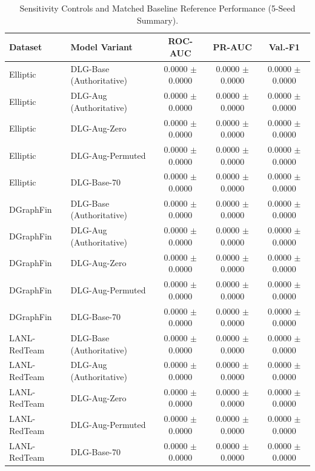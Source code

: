 \begin{table}[t]
\centering
\caption{Sensitivity Controls and Matched Baseline Reference Performance (5-Seed Summary).}
\label{tab:capacity_controls_summary}
\scriptsize
\begin{tabular}{l l c c c}
\toprule
\textbf{Dataset} & \textbf{Model Variant} & \textbf{ROC-AUC} & \textbf{PR-AUC} & \textbf{Val.-F1} \\
\midrule
Elliptic & DLG-Base (Authoritative) & 0.0000 $\pm$ 0.0000 & 0.0000 $\pm$ 0.0000 & 0.0000 $\pm$ 0.0000 \\
Elliptic & DLG-Aug (Authoritative) & 0.0000 $\pm$ 0.0000 & 0.0000 $\pm$ 0.0000 & 0.0000 $\pm$ 0.0000 \\
Elliptic & DLG-Aug-Zero & 0.0000 $\pm$ 0.0000 & 0.0000 $\pm$ 0.0000 & 0.0000 $\pm$ 0.0000 \\
Elliptic & DLG-Aug-Permuted & 0.0000 $\pm$ 0.0000 & 0.0000 $\pm$ 0.0000 & 0.0000 $\pm$ 0.0000 \\
Elliptic & DLG-Base-70 & 0.0000 $\pm$ 0.0000 & 0.0000 $\pm$ 0.0000 & 0.0000 $\pm$ 0.0000 \\
DGraphFin & DLG-Base (Authoritative) & 0.0000 $\pm$ 0.0000 & 0.0000 $\pm$ 0.0000 & 0.0000 $\pm$ 0.0000 \\
DGraphFin & DLG-Aug (Authoritative) & 0.0000 $\pm$ 0.0000 & 0.0000 $\pm$ 0.0000 & 0.0000 $\pm$ 0.0000 \\
DGraphFin & DLG-Aug-Zero & 0.0000 $\pm$ 0.0000 & 0.0000 $\pm$ 0.0000 & 0.0000 $\pm$ 0.0000 \\
DGraphFin & DLG-Aug-Permuted & 0.0000 $\pm$ 0.0000 & 0.0000 $\pm$ 0.0000 & 0.0000 $\pm$ 0.0000 \\
DGraphFin & DLG-Base-70 & 0.0000 $\pm$ 0.0000 & 0.0000 $\pm$ 0.0000 & 0.0000 $\pm$ 0.0000 \\
LANL-RedTeam & DLG-Base (Authoritative) & 0.0000 $\pm$ 0.0000 & 0.0000 $\pm$ 0.0000 & 0.0000 $\pm$ 0.0000 \\
LANL-RedTeam & DLG-Aug (Authoritative) & 0.0000 $\pm$ 0.0000 & 0.0000 $\pm$ 0.0000 & 0.0000 $\pm$ 0.0000 \\
LANL-RedTeam & DLG-Aug-Zero & 0.0000 $\pm$ 0.0000 & 0.0000 $\pm$ 0.0000 & 0.0000 $\pm$ 0.0000 \\
LANL-RedTeam & DLG-Aug-Permuted & 0.0000 $\pm$ 0.0000 & 0.0000 $\pm$ 0.0000 & 0.0000 $\pm$ 0.0000 \\
LANL-RedTeam & DLG-Base-70 & 0.0000 $\pm$ 0.0000 & 0.0000 $\pm$ 0.0000 & 0.0000 $\pm$ 0.0000 \\
\bottomrule
\end{tabular}
\end{table}
